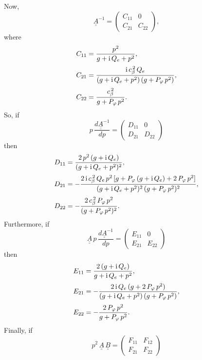 \documentclass[12pt,prb,aps,notitlepage]{revtex4-1}
\begin{document}
Now,
\begin{equation}
\underline{\underline{A}}^{-1}= \left(\begin{array}{cc} C_{11}&0\\C_{21}&C_{22}\end{array}\right),
\end{equation}
where
\begin{align}
C_{11} &= \frac{p^2}{g+{\rm i}\,Q_e+p^2},\\[0.5ex]
C_{21}&=\frac{{\rm i}\,c_\beta^{\,2}\,Q_e}{(g+{\rm i}\,Q_e+p^2)\,(g+P_\varphi\,p^2)},\\[0.5ex]
C_{22} &= \frac{c_\beta^{\,2}}{g+P_\varphi\,p^2}.
\end{align}
So, if
\begin{equation}
p\,\frac{d\underline{\underline{A}}^{-1}}{dp}= \left(\begin{array}{cc} D_{11}&0\\D_{21}&D_{22}\end{array}\right)
\end{equation}
then 
\begin{align}
D_{11} &= \frac{2\,p^2\,(g+{\rm i}\,Q_e)}{(g+{\rm i}\,Q_e+p^2)^2},\\[0.5ex]
D_{21} &= - \frac{2\,{\rm i}\,c_\beta^{\,2}\,Q_e\,p^2\,[g+ P_\varphi\,(g+{\rm i}\,Q_e) + 2\,P_\varphi\,p^2]}{(g+{\rm i}\,Q_e+p^2)^2\,(g+P_\varphi\,p^2)^2 },\\[0.5ex]
D_{22} &= -\frac{2\,c_\beta^{\,2}\,P_\varphi\,p^2}{(g+P_\varphi\,p^2)^2}.
\end{align}
Furthermore, if
\begin{equation}\label{ee1}
\underline{\underline{A}}\,p\,\frac{d\underline{\underline{A}}^{-1}}{dp}= \left(\begin{array}{cc} E_{11}&0\\E_{21}&E_{22}\end{array}\right)
\end{equation}
then 
\begin{align}
E_{11} &= \frac{2\,(g+{\rm i}\,Q_e)}{g+ {\rm i}\,Q_e+p^2},\\[0.5ex]
E_{21} &=-\frac{2\,{\rm i}\,Q_e\,(g+2\,P_\varphi\,p^2)}{(g+{\rm i}\,Q_e+p^2)\,(g+P_\varphi\,p^2)},\\[0.5ex]
E_{22} &= -\frac{2\,P_\varphi\,p^2}{g+ P_\varphi\,p^2}.\label{ee4}
\end{align}
Finally,  if
\begin{equation}
p^2\,\underline{\underline{A}}\,\underline{\underline{B}}= \left(\begin{array}{cc} F_{11}&F_{12}\\F_{21}&F_{22}\end{array}\right)
\end{equation}
\end{document}
